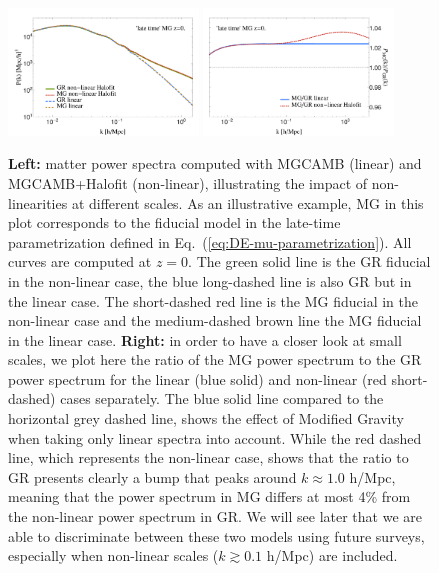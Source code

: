 \begin{figure}[htbp]
\begin{centering}
\includegraphics[width=0.45\textwidth]{Chapters/linear-nonlinear-MG-forecasts/figures/power-spectra/pk-GRvsMGDE2nonuhs_Lin-vs-Nonlin-zind_1}
\includegraphics[width=0.45\textwidth]{Chapters/linear-nonlinear-MG-forecasts/figures/power-spectra/pk-Ratios-GRvsMGDE2nonuhs_Lin-vs-Nonlin-zind_1} 
\par\end{centering}
\caption[MGCAMB power spectra, late-time parametrization.]{\label{fig:lin-non-pk-mg} \textbf{Left: }matter power
spectra
computed with MGCAMB (linear) and MGCAMB+Halofit (non-linear), illustrating the impact of non-linearities at different scales. As an illustrative example, MG in this plot corresponds to the fiducial model in the late-time parametrization defined in Eq.\ (\ref{eq:DE-mu-parametrization}).
All curves are computed at $z=0$. The green solid line is the GR
fiducial in the non-linear case, the blue long-dashed line is also
GR but in the linear case. The short-dashed red line is the MG fiducial
in the non-linear case and the medium-dashed brown line the MG fiducial
in the linear case.
\textbf{Right:
}in order to have a closer look at small scales, we plot here the
ratio of the MG power spectrum to the GR power spectrum for the linear
(blue solid) and non-linear (red short-dashed) cases separately. The blue solid line compared to the horizontal grey dashed line,
shows the effect of Modified Gravity when taking only linear spectra into account. While the red dashed line, which
represents the non-linear case, shows that the ratio to GR presents clearly a bump that peaks around
$k\approx1.0$ h/Mpc, meaning that the power spectrum in MG differs
at most 4\% from the non-linear power spectrum in GR. We will see later that we are able to 
discriminate between these two models using future surveys, especially when non-linear scales ($k \gtrsim 0.1$ h/Mpc) are included.
} 
\end{figure}



